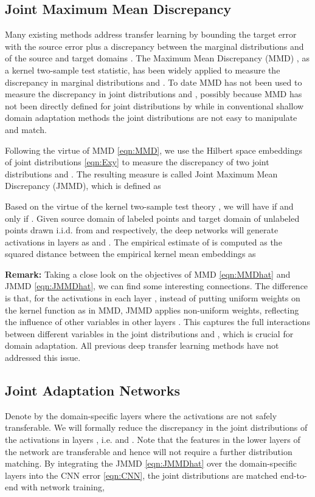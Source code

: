 \documentclass{article}
\begin{document}
\subsection{Joint Maximum Mean Discrepancy}
Many existing methods address transfer learning by bounding the target error with the source error plus a discrepancy between the marginal distributions  and  of the source and target domains \cite{cite:ML10DAT}. The Maximum Mean Discrepancy (MMD) \cite{cite:JMLR12MMD}, as a kernel two-sample test statistic, has been widely applied to measure the discrepancy in marginal distributions  and  \cite{cite:Arxiv14DDC,cite:ICML15DAN,cite:NIPS16RTN}. To date MMD has not been used to measure the discrepancy in joint distributions  and , possibly because MMD has not been directly defined for joint distributions by \cite{cite:JMLR12MMD} while in conventional shallow domain adaptation methods the joint distributions are not easy to manipulate and match.

Following the virtue of MMD \eqref{eqn:MMD}, we use the Hilbert space embeddings of joint distributions \eqref{eqn:Exy} to measure the discrepancy of two joint distributions  and . The resulting measure is called Joint Maximum Mean Discrepancy (JMMD), which is defined as

Based on the virtue of the kernel two-sample test theory \cite{cite:JMLR12MMD}, we will have  if and only if . Given source domain  of  labeled points and target domain  of  unlabeled points drawn i.i.d. from  and  respectively, the deep networks will generate activations in layers  as  and . The empirical estimate of  is computed as the squared distance between the empirical kernel mean embeddings as

\textbf{Remark:} Taking a close look on the objectives of MMD \eqref{eqn:MMDhat} and JMMD \eqref{eqn:JMMDhat}, we can find some interesting connections. The difference is that, for the activations  in each layer , instead of putting uniform weights on the kernel function  as in MMD, JMMD applies non-uniform weights, reflecting the influence of other variables in other layers . This captures the full interactions between different variables in the joint distributions  and , which is crucial for domain adaptation. All previous deep transfer learning methods \cite{cite:Arxiv14DDC,cite:ICML15DAN,cite:ICML15RevGrad,cite:ICCV15SDT,cite:NIPS16RTN} have not addressed this issue.

\subsection{Joint Adaptation Networks}
Denote by  the domain-specific layers where the activations are not safely transferable. We will formally reduce the discrepancy in the joint distributions of the activations in layers , i.e.  and . Note that the features in the lower layers of the network are transferable and hence will not require a further distribution matching. By integrating the JMMD \eqref{eqn:JMMDhat} over the domain-specific layers  into the CNN error \eqref{eqn:CNN}, the joint distributions are matched end-to-end with network training, 
\end{document}

